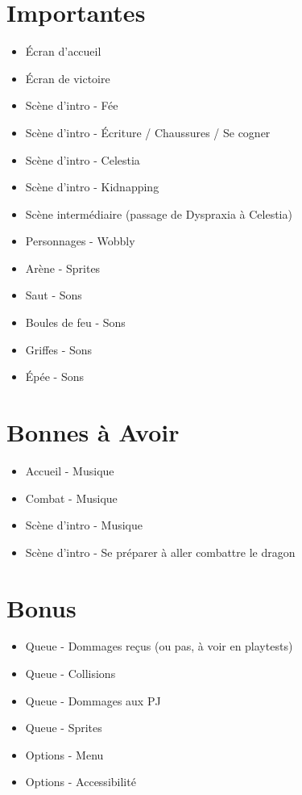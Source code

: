 \documentclass{scrartcl}
\begin{document}
	\section{Importantes}
	\begin{itemize}
		\item Écran d'accueil
		\item Écran de victoire
		\item Scène d'intro - Fée
		\item Scène d'intro - Écriture / Chaussures / Se cogner
		\item Scène d'intro - Celestia
		\item Scène d'intro - Kidnapping
		\item Scène intermédiaire (passage de Dyspraxia à Celestia)
		\item Personnages - Wobbly 
		\item Arène - Sprites
		\item Saut - Sons
		\item Boules de feu - Sons
		\item Griffes - Sons
		\item Épée - Sons
	\end{itemize}
	\section{Bonnes à Avoir}
	\begin{itemize}
	\item Accueil - Musique
	\item Combat - Musique
	\item Scène d'intro - Musique
	\item Scène d'intro - Se préparer à aller combattre le dragon
	\end{itemize}
	\section{Bonus}
	\begin{itemize}
		\item Queue - Dommages reçus (ou pas, à voir en playtests)
		\item Queue - Collisions
		\item Queue - Dommages aux PJ 
		\item Queue - Sprites
		\item Options - Menu
		\item Options - Accessibilité
	\end{itemize}
	
\end{document}
